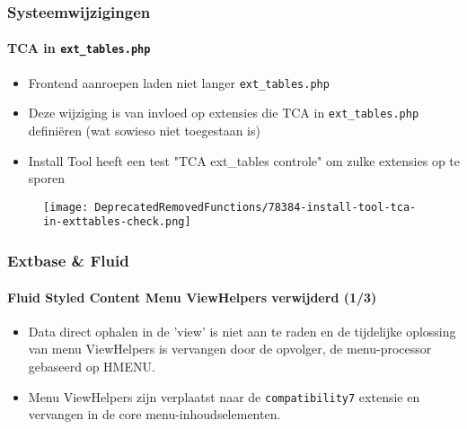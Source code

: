 \begin{frame}[fragile]
	\frametitle{Systeemwijzigingen}
	\framesubtitle{TCA in \texttt{ext\_tables.php}}

	\begin{itemize}
		\item Frontend aanroepen laden niet langer \texttt{ext\_tables.php}
		\item Deze wijziging is van invloed op extensies die TCA in  \texttt{ext\_tables.php} definiëren\newline
			\small(wat sowieso niet toegestaan is)\normalsize
		\item Install Tool heeft een test "TCA ext\_tables controle" om zulke extensies op te sporen
	\end{itemize}

	\begin{figure}
		\texttt{[image: DeprecatedRemovedFunctions/78384-install-tool-tca-in-exttables-check.png]}
	\end{figure}

\end{frame}


\begin{frame}[fragile]
	\frametitle{Extbase \& Fluid}
	\framesubtitle{Fluid Styled Content Menu ViewHelpers verwijderd (1/3)}

	\begin{itemize}
		\item Data direct ophalen in de 'view' is niet aan te raden en de tijdelijke oplossing
			van menu ViewHelpers is vervangen door de opvolger, de menu-processor
			gebaseerd op HMENU.

		\item Menu ViewHelpers zijn verplaatst naar de \texttt{compatibility7}
			extensie en vervangen in de core menu-inhoudselementen.

	\end{itemize}

\end{frame}

